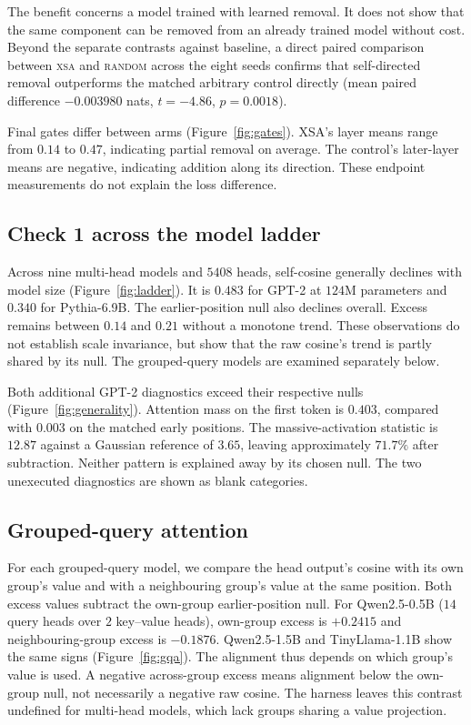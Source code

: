 \documentclass{article} %
\begin{document}
The benefit concerns a model trained with learned removal. It does not show
that the same component can be removed from an already trained model without
cost. Beyond the separate contrasts against baseline, a direct paired comparison
between \textsc{xsa} and \textsc{random} across the eight seeds confirms that
self-directed removal outperforms the matched arbitrary control directly
(mean paired difference $-0.003980$ nats, $t = -4.86$, $p = 0.0018$).

Final gates differ between arms (Figure~\ref{fig:gates}). XSA's layer means
range from $0.14$ to $0.47$, indicating partial removal on average.
The control's later-layer means are negative, indicating addition along
its direction. These endpoint measurements do not explain the loss difference.

\subsection{Check 1 across the model ladder}
\label{sec:ladder}

Across nine multi-head models and $5408$ heads, self-cosine generally
declines with model size (Figure~\ref{fig:ladder}). It is $0.483$ for
GPT-2 at $124$M parameters and $0.340$ for Pythia-6.9B. The earlier-position
null also declines overall. Excess remains between $0.14$ and $0.21$
without a monotone trend. These observations do not establish scale
invariance, but show that the raw cosine's trend is partly shared by its
null. The grouped-query models are examined separately below.

Both additional GPT-2 diagnostics exceed their respective nulls
(Figure~\ref{fig:generality}). Attention mass on the first token is
$0.403$, compared with $0.003$ on the matched early positions. The
massive-activation statistic is $12.87$ against a Gaussian reference of
$3.65$, leaving approximately $71.7\%$ after subtraction. Neither pattern
is explained away by its chosen null. The two unexecuted diagnostics are
shown as blank categories.

\subsection{Grouped-query attention}
\label{sec:gqa}

For each grouped-query model, we compare the head output's cosine with its
own group's value and with a neighbouring group's value at the same position.
Both excess values subtract the own-group earlier-position null. For
Qwen2.5-0.5B ($14$ query heads over $2$ key--value heads), own-group excess
is $+0.2415$ and neighbouring-group excess is $-0.1876$. Qwen2.5-1.5B
and TinyLlama-1.1B show the same signs (Figure~\ref{fig:gqa}). The
alignment thus depends on which group's value is used. A negative
across-group excess means alignment below the own-group null, not
necessarily a negative raw cosine. The harness leaves this contrast
undefined for multi-head models, which lack groups sharing a value
projection.
\end{document}
